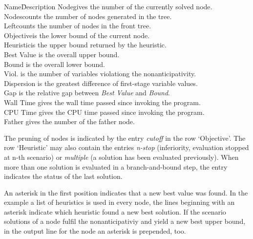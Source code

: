 \documentclass[11pt,draft]{article}
\newcommand{\+}{{\ti{+}}}
\newcommand{\1}{{\ti{1}}}
\begin{document}
\noindent
\begin{tabbing}
Name\hspace*{1cm}\=Description \kill
Node\>gives the number of the currently solved node.\\
Nodes\>counts the number of nodes generated in the tree.\\
Left\>counts the number of nodes in the front tree.\\
Objective\>is the lower bound of the current node. \\
Heuristic\>is the upper bound returned by the heuristic. \\
Best Value\> is the overall upper bound.\\
Bound\> is the overall lower bound.\\
Viol.\> is the number of variables violationg the nonanticipativity.\\
Dispersion\> is the greatest difference of first-stage variable values.\\
Gap\> is the relative gap between {\it Best Value} and {\it Bound}.\\
Wall Time\> gives the wall time passed since invoking the program.\\
CPU Time\> gives the CPU time passed since invoking the program.\\
Father\> gives the number of the father node.\\
\end{tabbing}

The pruning of nodes is indicated by the entry {\it cutoff} in the row `Objective'. 
The row `Heuristic' may also contain the entries {\it n-stop} (inferiority, evaluation stopped at
n-th scenario) or {\it multiple} (a solution has been evaluated previously). When more than one
solution is evaluated in a branch-and-bound step, the entry indicates the status of the last
solution.

An asterisk in the first position indicates that a new best value was found.
In the example a list of heuristics is used in every node, the lines beginning with an asterisk
indicate which heuristic found a new best solution.
If the scenario solutions of a node fulfil the nonanticipativiy and yield
a new best upper bound, in the output line for the node an asterisk is prepended, too.
%
\end{document}
